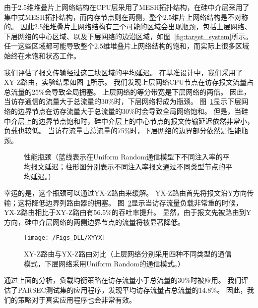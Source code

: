 由于2.5维堆叠片上网络结构在CPU层采用了MESH拓扑结构，在硅中介层采用了集中式MESH拓扑结构，而内存节点则在两侧，整个2.5维片上网络结构是不对称的。
因此2.5维堆叠片上网络结构有三个可能的区域会出现瓶颈，包括上层网络、下层网络的中心区域、以及下层网络的边沿区域，如图~\ref{fig:target_system}所示。
任一这些区域都可能导致整个2.5维堆叠片上网络结构的饱和，而实际上很多区域始终在未饱和状态工作。

我们评估了报文传输经过这三块区域的平均延迟。
在基准设计中，我们采用了XY-Z路由，实验结果如图~\ref{fig:bottleneck}所示。
我们发现上层网络CPU节点在访存报文流量占总流量的25\%会导致全局拥塞。
上层网络的等分带宽是下层网络的两倍。
因此，当访存通信的流量大于总流量的30\%时，下层网络将成为瓶颈。
图~\ref{fig:bottleneck}显示下层网络的边界节点在访存流量大于总流量的30\%时会导致全局网络饱和。
但是，当硅中介层上的边界节点饱和时，硅中介层上的中心节点的报文传输延迟依然非常小，负载也较低。
当访存流量占总流量的75\%时，下层网络的边界部分依然是性能瓶颈。

\begin{figure}[htb]
\centering
{} 
\qquad
{}
\caption{性能瓶颈（蓝线表示在Uniform Random通信模型下不同注入率的平均报文延迟；柱形图分别表示不同注入率报文通过不同类型节点的平均延迟。）}
\label{fig:bottleneck}
\end{figure}


幸运的是，这个瓶颈可以通过YX-Z路由来缓解。
YX-Z路由首先将报文沿Y方向传输；这将降低边界列路由器的拥塞。
图~\ref{fig:XYYX}显示当访存流量负载非常重的时候，YX-Z路由相比于XY-Z路由有56.5\%的吞吐率提升。
显然，由于报文先被路由到Y方向，硅中介层网络的两侧边界节点的流量将被显著降低。

\begin{figure}[htbp] %
  \centering
  \texttt{[image: /Figs\_DLL/XYYX]}
  \caption{XY-Z路由与YX-Z路由对比（上层网络分别采用四种不同类型的通信模式，下层网络采用Uniform Random的通信模式。）}
  \label{fig:XYYX}
\end{figure}

通过上面的分析，负载均衡策略在访存流量小于总流量的30\%时被应用。
我们评估了PARSEC测试集的应用程序，发现平均访存流量占总流量的14.8\%。
因此，我们的策略对于真实应用程序也会非常有效。

